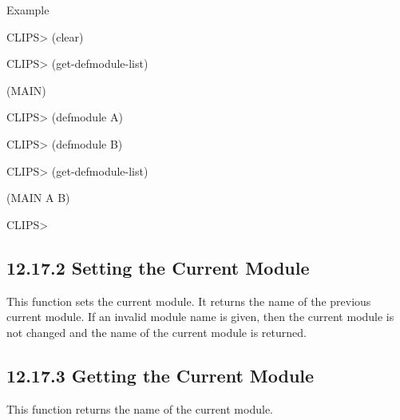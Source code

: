 \documentclass[letterpaper,10pt,english]{sphinxmanual}
\begin{document}

\begin{sphinxVerbatim}[commandchars=\\\{\}]
\end{sphinxVerbatim}

Example

CLIPS\textgreater{} (clear)

CLIPS\textgreater{} (get-defmodule-list)

(MAIN)

CLIPS\textgreater{} (defmodule A)

CLIPS\textgreater{} (defmodule B)

CLIPS\textgreater{} (get-defmodule-list)

(MAIN A B)

CLIPS\textgreater{}


\subsection{12.17.2 Setting the Current Module}
\label{\detokenize{actions:setting-the-current-module}}
This function sets the current module. It returns the name of the
previous current module. If an invalid module name is given, then the
current module is not changed and the name of the current module is
returned.


\begin{sphinxVerbatim}[commandchars=\\\{\}]
 
\end{sphinxVerbatim}


\subsection{12.17.3 Getting the Current Module}
\label{\detokenize{actions:getting-the-current-module}}
This function returns the name of the current module.


\begin{sphinxVerbatim}[commandchars=\\\{\}]
\end{sphinxVerbatim}
\end{document}
